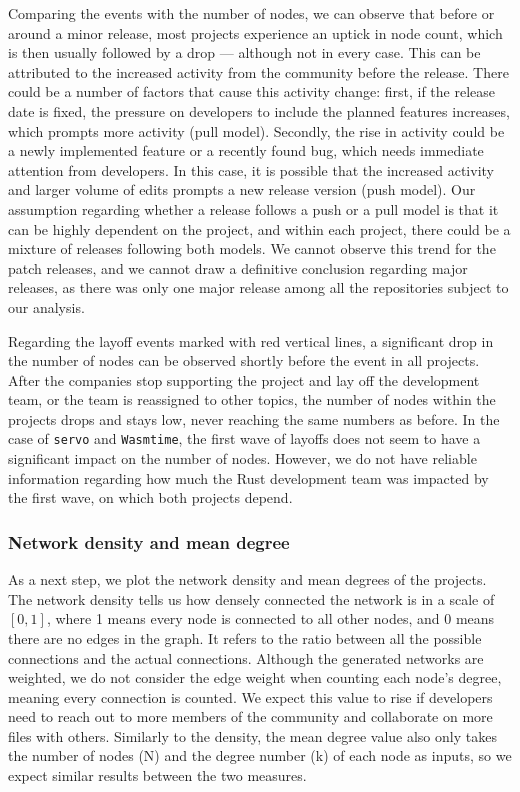 Comparing the events with the number of nodes, we can observe that before or around a minor release, most projects experience an uptick in node count, which is then usually followed by a drop — although not in every case. This can be attributed to the increased activity from the community before the release. There could be a number of factors that cause this activity change: first, if the release date is fixed, the pressure on developers to include the planned features increases, which prompts more activity (pull model). Secondly, the rise in activity could be a newly implemented feature or a recently found bug, which needs immediate attention from developers. In this case, it is possible that the increased activity and larger volume of edits prompts a new release version (push model). Our assumption regarding whether a release follows a push or a pull model is that it can be highly dependent on the project, and within each project, there could be a mixture of releases following both models. We cannot observe this trend for the patch releases, and we cannot draw a definitive conclusion regarding major releases, as there was only one major release among all the repositories subject to our analysis.

Regarding the layoff events marked with red vertical lines, a significant drop in the number of nodes can be observed shortly before the event in all projects. After the companies stop supporting the project and lay off the development team, or the team is reassigned to other topics, the number of nodes within the projects drops and stays low, never reaching the same numbers as before. In the case of \texttt{servo} and \texttt{Wasmtime}, the first wave of layoffs does not seem to have a significant impact on the number of nodes. However, we do not have reliable information regarding how much the Rust development team was impacted by the first wave, on which both projects depend.

\subsubsection{Network density and mean degree}
\label{sec:density_degree}
As a next step, we plot the network density and mean degrees of the projects. The network density tells us how densely connected the network is in a scale of $[0,1]$, where 1 means every node is connected to all other nodes, and 0 means there are no edges in the graph. It refers to the ratio between all the possible connections and the actual connections. Although the generated networks are weighted, we do not consider the edge weight when counting each node's degree, meaning every connection is counted. We expect this value to rise if developers need to reach out to more members of the community and collaborate on more files with others. Similarly to the density, the mean degree value also only takes the number of nodes (N) and the degree number (k) of each node as inputs, so we expect similar results between the two measures.

